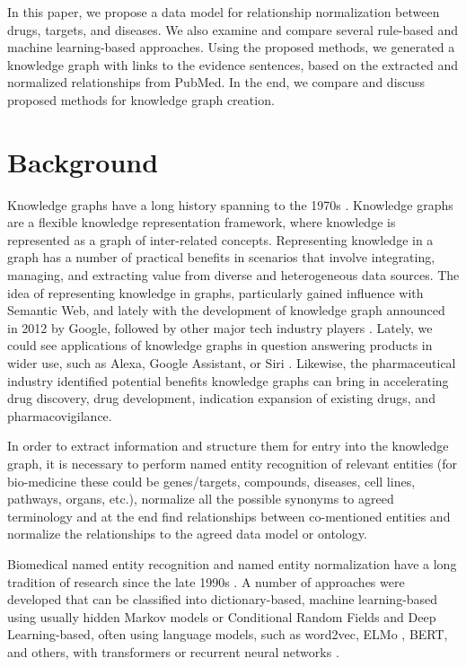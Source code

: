 \documentclass[final,12pt,3p,times,twocolumn,authoryear]{elsarticle}
\begin{document}
In this paper, we propose a data model for relationship normalization between drugs, targets, and diseases. We also examine and compare several rule-based and machine learning-based approaches. Using the proposed methods, we generated a knowledge graph with links to the evidence sentences, based on the extracted and normalized relationships from PubMed. In the end, we compare and discuss proposed methods for knowledge graph creation. 


\section{Background}

Knowledge graphs have a long history spanning to the 1970s \citep{schneider1973course}. Knowledge graphs are a flexible knowledge representation framework, where knowledge is represented as a graph of inter-related concepts. Representing knowledge in a graph has a number of practical benefits in scenarios that involve integrating, managing, and extracting value from diverse and heterogeneous data sources. The idea of representing knowledge in graphs, particularly gained influence with Semantic Web, and lately with the development of knowledge graph announced in 2012 by Google, followed by other major tech industry players \citep{hogan2021knowledge}. Lately, we could see applications of knowledge graphs in question answering products in wider use, such as Alexa, Google Assistant, or Siri \citep{zhang2018variational}. Likewise, the pharmaceutical industry identified potential benefits knowledge graphs can bring in accelerating drug discovery, drug development, indication expansion of existing drugs, and pharmacovigilance.

In order to extract information and structure them for entry into the knowledge graph, it is necessary to perform named entity recognition of relevant entities (for bio-medicine these could be genes/targets, compounds, diseases, cell lines, pathways, organs, etc.), normalize all the possible synonyms to agreed terminology and at the end find relationships between co-mentioned entities and normalize the relationships to the agreed data model or ontology.
  

Biomedical named entity recognition and named entity normalization have a long tradition of research since the late 1990s \citep{fukuda1998toward,collier2000extracting}. A number of approaches were developed that can be classified into dictionary-based, machine learning-based using usually hidden Markov models or Conditional Random Fields and Deep Learning-based, often using language models, such as word2vec, ELMo \citep{milosevic2020mask}, BERT, and others, with transformers \citep{khan2020mt} or recurrent neural networks \citep{belousov2019extracting}. 
\end{document}

